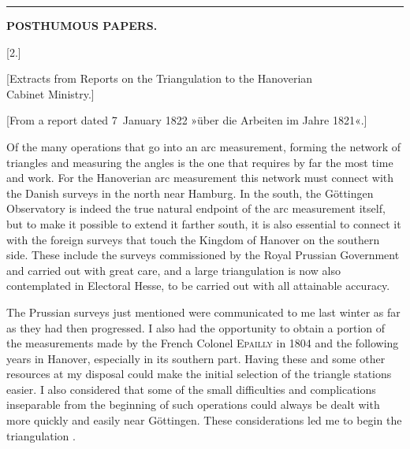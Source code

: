 \begin{center}
\rule{.24\linewidth}{.4pt}
\end{center}
\clearpage

\noindent{}\hfill{\small\textbf{POSTHUMOUS PAPERS.}}\hfill\null\par
\vspace{2\baselineskip}
\begin{center}
[2.]\par\smallskip
{\large [Extracts from Reports on the Triangulation to the Hanoverian\\
Cabinet Ministry.]}
\end{center}
\bigskip
\begin{center}
[From a report dated 7~January 1822 »über die Arbeiten im Jahre 1821«.]
\end{center}

\par\noindent\hspace*{\parindent}Of the many operations that go into an arc measurement, forming the
network of triangles and measuring the angles is the one that requires by far
the most time and work. For the Hanoverian arc measurement this network
must connect with the Danish surveys in the north near Hamburg. In the south,
the Göttingen Observatory is indeed the true natural endpoint of the arc measurement
itself, but to make it possible to extend it farther south, it is also essential
to connect it with the foreign surveys that touch the Kingdom of Hanover
on the southern side. These include the surveys commissioned by the Royal
Prussian Government and carried out with great care, and a large triangulation
is now also contemplated in Electoral Hesse, to be carried out with all attainable
accuracy.

\par\noindent\hspace*{\parindent}The Prussian surveys just mentioned were communicated to me last
winter as far as they had then progressed. I also had the opportunity to obtain
a portion of the measurements made by the French Colonel \textsc{Epailly}
in 1804 and the following years in Hanover, especially in its southern part.
Having these and some other resources at my disposal could make the initial
selection of the triangle stations easier. I also considered that some of the
small difficulties and complications inseparable from the beginning of such
operations could always be dealt with more quickly and easily near Göttingen.
These considerations led me to begin the triangulation .

